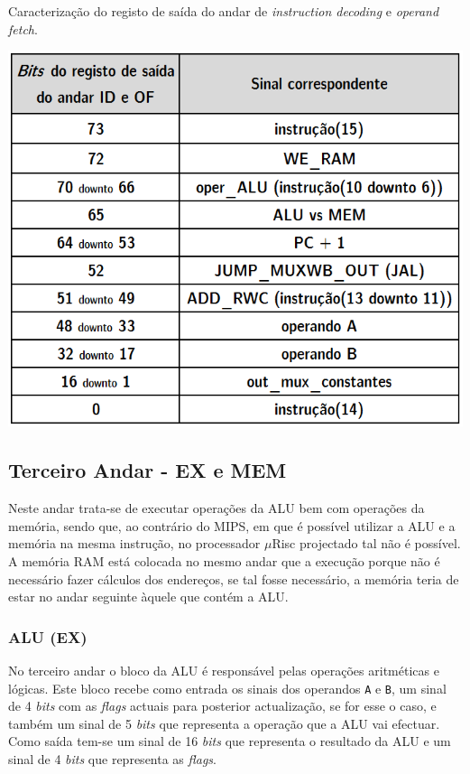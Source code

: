 \documentclass[11pt]{article}
\numberwithin{equation}{section}
\begin{document}
\begin{table}[h]
	\centering
	\caption{Caracterização do registo de saída do andar de \textit{instruction decoding} e \textit{operand fetch}.}
	\vspace{-2mm}
 	\includegraphics[keepaspectratio=true, scale=0.45]{tabelas/regIDOF}
\end{table}

\subsection{Terceiro Andar - EX e MEM}

Neste andar trata-se de executar operações da ALU bem com operações da memória, sendo que, ao contrário do MIPS, em que é possível utilizar a ALU e a memória na mesma instrução, no processador $\mu$Risc projectado tal não é possível. A memória RAM está colocada no mesmo andar que a execução porque não é necessário fazer cálculos dos endereços, se tal fosse necessário, a memória teria de estar no andar seguinte àquele que contém a ALU. 

\subsubsection{ALU (EX)}

No terceiro andar o bloco da ALU é responsável pelas operações aritméticas e lógicas. Este bloco recebe como entrada os sinais dos operandos \texttt{A} e \texttt{B}, um sinal de 4 \textit{bits} com as \textit{flags} actuais para posterior actualização, se for esse o caso, e também um sinal de 5 \textit{bits} que representa a operação que a ALU vai efectuar. Como saída tem-se um sinal de 16 \textit{bits} que representa o resultado da ALU e um sinal de 4 \textit{bits} que representa as \textit{flags}.
\end{document}
